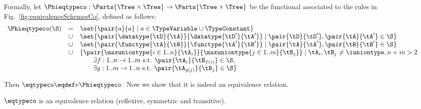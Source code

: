 Formally, let $\Phieqtypeco : \Parts{\Tree \times \Tree} \to \Parts{\Tree
\times \Tree}$ be the functional associated to the rules in
Fig.~\ref{fig:equivalenceSchemesCo}, defined as follows: $$
\begin{array}{rcl}
\Phieqtypeco(\S) & =    & \set{\pair{a}{a} \mathrel| a \in \TypeVariable \cup \TypeConstant} \\
                 & \cup & \set{\pair{\datatype{\tD}{\tA}}{\datatype{\tD'}{\tA'}} \mathrel| \pair{\tD}{\tD'}, \pair{\tA}{\tA'} \in \S} \\
                 & \cup & \set{\pair{\functype{\tA}{\tB}}{\functype{\tA'}{\tB'}} \mathrel| \pair{\tA}{\tA'}, \pair{\tB}{\tB'} \in \S} \\
                 & \cup & \{\pair{\maxuniontype{i \in 1..n}{\tA_i}}{\maxuniontype{j \in 1..m}{\tB_j}} \mathrel| \tA_i, \tB_j \neq \iuniontype, n + m > 2 \\
                 &      & \qquad \exists f : 1..n \to 1..m \text{ s.t. } \pair{\tA_i}{\tB_{f(i)}} \in \S, \\
                 &      & \qquad \exists g : 1..m \to 1..n \text{ s.t. } \pair{\tA_{g(j)}}{\tB_j} \in \S\}
\end{array} $$

Then $\mathbin{\eqtypeco} \eqdef \nu\Phieqtypeco$. Now we show that it is
indeed an equivalence relation.



\begin{lemma}
$\eqtypeco$ is an equivalence relation (\ie reflexive, symmetric and
transitive).
\end{lemma}

